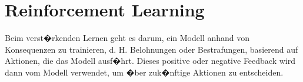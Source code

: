 \chapter{Reinforcement Learning}

Beim verst�rkenden Lernen geht es darum, ein Modell anhand von Konsequenzen zu trainieren, d. H. Belohnungen oder Bestrafungen, basierend auf Aktionen, die das Modell ausf�hrt. Dieses positive oder negative Feedback wird dann vom Modell verwendet, um �ber zuk�nftige Aktionen zu entscheiden.





